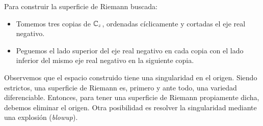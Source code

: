 \begin{solution}
\begin{itemize}
\begin{enumerate}[label=\alph*)]
        Para construir la superficie de Riemann buscada:
        \begin{itemize}
            \item Tomemos tres copias de $\mathbb C_z$, ordenadas cíclicamente y cortadas el eje real negativo.
            \item Peguemos el lado superior del eje real negativo en cada copia con el lado inferior del mismo eje real negativo en la siguiente copia.
        \end{itemize}
        
        Observemos que el espacio construido tiene una singularidad en el origen. Siendo estrictos, una superficie de Riemann es, primero y ante todo, una variedad diferenciable. Entonces, para tener una superficie de Riemann propiamente dicha, debemos eliminar el origen. Otra posibilidad es resolver la singularidad mediante una explosión (\textit{blowup}).
        

\end{enumerate}
\end{itemize}
\end{solution}
